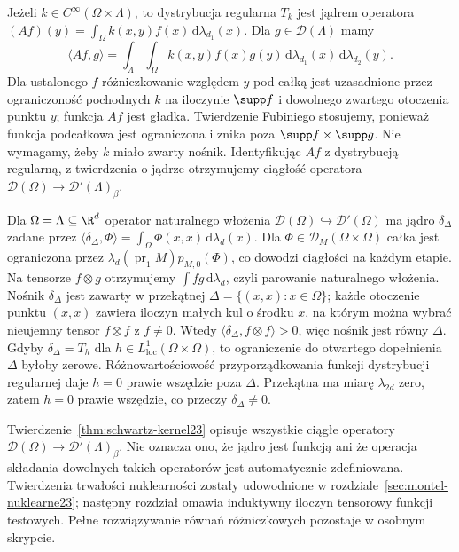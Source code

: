 \begin{przyklad}
\label{ex:smooth-kernel23}
Jeżeli $k\in C^\infty(\Omega\times\Lambda)$, to dystrybucja
regularna $T_k$ jest jądrem operatora
$(Af)(y)=\int_\Omega k(x,y)f(x)\,\mathrm d\lambda_{d_1}(x)$.
Dla $g\in\mathcal D(\Lambda)$ mamy
\[
\langle Af,g\rangle
=\int_{\Lambda}\int_{\Omega}k(x,y)f(x)g(y)
\,\mathrm d\lambda_{d_1}(x)\,\mathrm d\lambda_{d_2}(y).
\]
Dla ustalonego $f$ różniczkowanie względem $y$
pod całką jest uzasadnione przez ograniczoność pochodnych
$k$ na iloczynie $\supp f$ i dowolnego zwartego
otoczenia punktu $y$; funkcja $Af$ jest gładka.
Twierdzenie Fubiniego stosujemy, ponieważ funkcja
podcałkowa jest ograniczona i znika poza
$\supp f\times\supp g$. Nie wymagamy, żeby $k$
miało zwarty nośnik. Identyfikując $Af$ z dystrybucją
regularną, z twierdzenia o jądrze otrzymujemy
ciągłość operatora $\mathcal D(\Omega)\to
\mathcal D'(\Lambda)_\beta$.
\end{przyklad}

\begin{przyklad}
\label{ex:diagonal-kernel23}
Dla $\Omega=\Lambda\subseteq\R^d$ operator naturalnego
włożenia $\mathcal D(\Omega)\hookrightarrow\mathcal D'(\Omega)$
ma jądro $\delta_\Delta$ zadane przez
$\langle\delta_\Delta,\Phi\rangle
=\int_\Omega\Phi(x,x)\,\mathrm d\lambda_d(x)$.
Dla $\Phi\in\mathcal D_M(\Omega\times\Omega)$
całka jest ograniczona przez
$\lambda_d(\operatorname{pr}_1 M)p_{M,0}(\Phi)$,
co dowodzi ciągłości na każdym etapie.
Na tensorze $f\otimes g$ otrzymujemy $\int fg\,
\mathrm d\lambda_d$, czyli parowanie naturalnego
włożenia. Nośnik $\delta_\Delta$ jest zawarty
w przekątnej $\Delta=\{(x,x):x\in\Omega\}$;
każde otoczenie punktu $(x,x)$ zawiera iloczyn
małych kul o środku $x$, na którym można wybrać
nieujemny tensor $f\otimes f$ z $f\ne0$.
Wtedy $\langle\delta_\Delta,f\otimes f\rangle>0$,
więc nośnik jest równy $\Delta$.
Gdyby $\delta_\Delta=T_h$ dla
$h\in L^1_{\mathrm{loc}}(\Omega\times\Omega)$,
to ograniczenie do otwartego dopełnienia $\Delta$
byłoby zerowe. Różnowartościowość przyporządkowania
funkcji dystrybucji regularnej daje $h=0$ prawie
wszędzie poza $\Delta$. Przekątna ma miarę
$\lambda_{2d}$ zero, zatem $h=0$ prawie wszędzie,
co przeczy $\delta_\Delta\ne0$.
\end{przyklad}

\begin{uwaga}
\label{rem:kernel-scope23}
Twierdzenie~\ref{thm:schwartz-kernel23} opisuje wszystkie
ciągłe operatory $\mathcal D(\Omega)\to\mathcal D'(\Lambda)_\beta$.
Nie oznacza ono, że jądro jest funkcją ani że operacja
składania dowolnych takich operatorów jest automatycznie
zdefiniowana. Twierdzenia trwałości nuklearności zostały udowodnione
w rozdziale~\ref{sec:montel-nuklearne23}; następny rozdział omawia
induktywny iloczyn tensorowy funkcji testowych. Pełne rozwiązywanie równań
różniczkowych pozostaje w osobnym skrypcie.
\end{uwaga}
